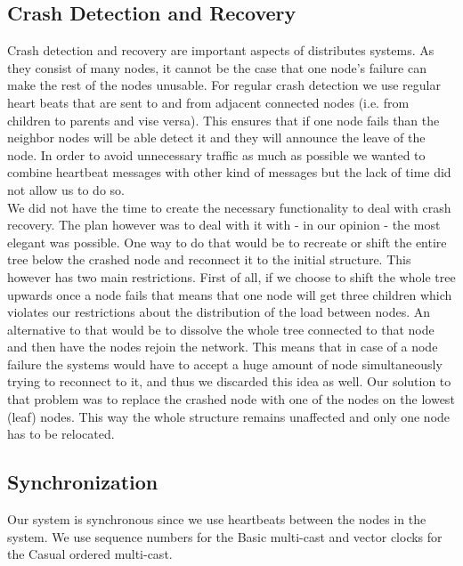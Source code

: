 \subsection{Crash Detection and Recovery}

Crash detection and recovery are important aspects of distributes systems. As they consist of many nodes, it cannot be the case that one node's failure can make the rest of the nodes unusable. For regular crash detection we use regular heart beats that are sent to and from adjacent connected nodes (i.e. from children to parents and vise versa). This ensures that if one node fails than the neighbor nodes will be able detect it and they will announce the leave of the node. In order to avoid unnecessary traffic as much as possible we wanted to combine heartbeat messages with other kind of messages but the lack of time did not allow us to do so.\\

We did not have the time to create the necessary functionality to deal with crash recovery. The plan however was to deal with it with - in our opinion - the most elegant was possible. One way to do that would be to recreate or shift the entire tree below the crashed node and reconnect it to the initial structure. This however has two main restrictions. First of all, if we choose to shift the whole tree upwards once a node fails that means that one node will get three children which violates our restrictions about the distribution of the load between nodes. An alternative to that would be to dissolve the whole tree connected to that node and then have the nodes rejoin the network. This means that in case of a node failure the systems would have to accept a huge amount of node simultaneously trying to reconnect to it, and thus we discarded this idea as well. Our solution to that problem was to replace the crashed node with one of the nodes on the lowest (leaf) nodes. This way the whole structure remains unaffected and only one node has to be relocated.\\

\subsection{Synchronization}

Our system is synchronous since we use heartbeats between the nodes in the system. We use sequence numbers for the Basic multi-cast and vector clocks for the Casual ordered multi-cast.\\

